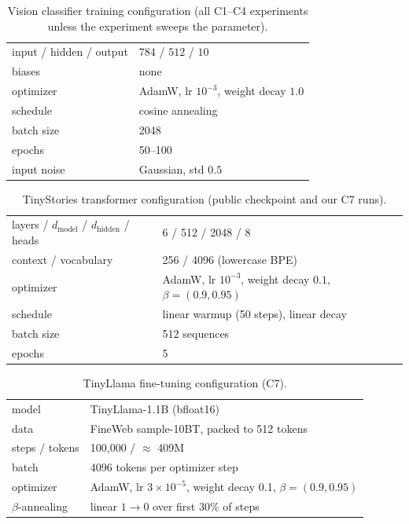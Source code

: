 \documentclass[10pt]{article} %
\begin{document}
\begin{table}[H]
\begin{center}
\begin{tabular}{ll}
\toprule
input / hidden / output & $784$ / $512$ / $10$ \\
biases & none \\
optimizer & AdamW, lr $10^{-3}$, weight decay $1.0$ \\
schedule & cosine annealing \\
batch size & 2048 \\
epochs & 50--100 \\
input noise & Gaussian, std $0.5$ \\
\bottomrule
\end{tabular}
\end{center}
\caption{Vision classifier training configuration (all C1--C4 experiments unless the
experiment sweeps the parameter).}
\end{table}

\begin{table}[H]
\begin{center}
\begin{tabular}{ll}
\toprule
layers / $d_{\text{model}}$ / $d_{\text{hidden}}$ / heads & 6 / 512 / 2048 / 8 \\
context / vocabulary & 256 / 4096 (lowercase BPE) \\
optimizer & AdamW, lr $10^{-3}$, weight decay $0.1$, $\beta = (0.9, 0.95)$ \\
schedule & linear warmup (50 steps), linear decay \\
batch size & 512 sequences \\
epochs & 5 \\
\bottomrule
\end{tabular}
\end{center}
\caption{TinyStories transformer configuration (public checkpoint and our C7 runs).}
\end{table}

\begin{table}[H]
\begin{center}
\begin{tabular}{ll}
\toprule
model & TinyLlama-1.1B (bfloat16) \\
data & FineWeb sample-10BT, packed to 512 tokens \\
steps / tokens & 100{,}000 / $\approx$ 409M \\
batch & 4096 tokens per optimizer step \\
optimizer & AdamW, lr $3 \times 10^{-5}$, weight decay 0.1, $\beta = (0.9, 0.95)$ \\
$\beta$-annealing & linear $1 \to 0$ over first 30\% of steps \\
\bottomrule
\end{tabular}
\end{center}
\caption{TinyLlama fine-tuning configuration (C7).}
\end{table}
\end{document}
